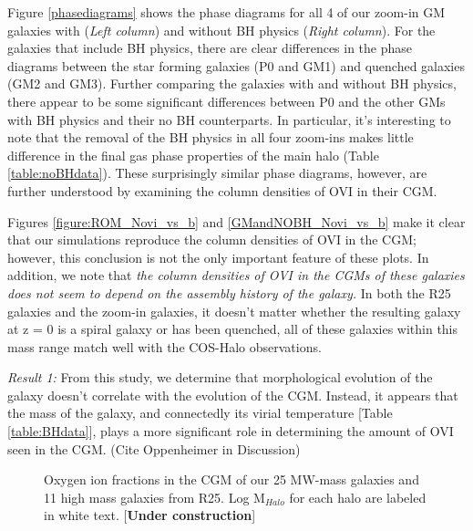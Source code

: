 \documentclass[]{emulateapj}
\begin{document}

Figure \ref{phasediagrams} shows the phase diagrams for all 4 of our zoom-in GM galaxies with (\textit{Left column}) and without BH physics (\textit{Right column}). For the galaxies that include BH physics, there are clear differences in the phase diagrams between the star forming galaxies (P0 and GM1) and quenched galaxies (GM2 and GM3). Further comparing the galaxies with and without BH physics, there appear to be some significant differences between P0 and the other GMs with BH physics and their no BH counterparts. In particular, it's interesting to note that the removal of the BH physics in all four zoom-ins makes little difference in the final gas phase properties of the main halo (Table \ref{table:noBHdata}). These surprisingly similar phase diagrams, however, are further understood by examining the column densities of OVI in their CGM.

Figures \ref{figure:ROM_Novi_vs_b} and \ref{GMandNOBH_Novi_vs_b} make it clear that our simulations reproduce the column densities of OVI in the CGM; however, this conclusion is not the only important feature of these plots. In addition, we note that \textit{the column densities of OVI in the CGMs of these galaxies does not seem to depend on the assembly history of the galaxy.} In both the R25 galaxies and the zoom-in galaxies, it doesn't matter whether the resulting galaxy at z = 0 is a spiral galaxy or has been quenched, all of these galaxies within this mass range match well with the COS-Halo observations.

\textit{Result 1:} From this study, we determine that morphological evolution of the galaxy doesn't correlate with the evolution of the CGM. Instead, it appears that the mass of the galaxy, and connectedly its virial temperature [Table \ref{table:BHdata}], plays a more significant role in determining the amount of OVI seen in the CGM. (Cite Oppenheimer in Discussion)

\begin{figure}[ht!]
\centerline{}
\caption[]{Oxygen ion fractions in the CGM of our 25 MW-mass galaxies and 11 high mass galaxies from R25. Log M$_{Halo}$ for each halo are labeled in white text. [\textbf{Under construction}]}
\label{oppenheimer}
\end{figure}
\end{document}

